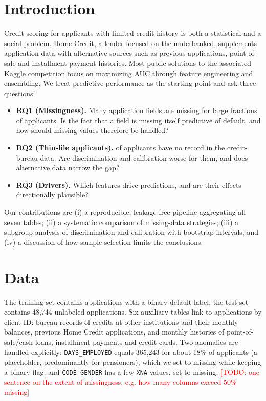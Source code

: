 \documentclass[10pt]{article}
\newcommand{\todo}[1]{\textcolor{red}{[TODO: #1]}}
\begin{document}
\section{Introduction}
Credit scoring for applicants with limited credit history is both a statistical and a social problem. Home Credit, a lender focused on the underbanked, supplements application data with alternative sources such as previous applications, point-of-sale and installment payment histories. Most public solutions to the associated Kaggle competition focus on maximizing AUC through feature engineering and ensembling. We treat predictive performance as the starting point and ask three questions:
\begin{itemize}\itemsep0pt
\item \textbf{RQ1 (Missingness).} Many application fields are missing for large fractions of applicants. Is the fact that a field is missing itself predictive of default, and how should missing values therefore be handled?
\item \textbf{RQ2 (Thin-file applicants).} \ThinShare{} of applicants have no record in the credit-bureau data. Are discrimination and calibration worse for them, and does alternative data narrow the gap?
\item \textbf{RQ3 (Drivers).} Which features drive predictions, and are their effects directionally plausible?
\end{itemize}
Our contributions are (i) a reproducible, leakage-free pipeline aggregating all seven tables; (ii) a systematic comparison of missing-data strategies; (iii) a subgroup analysis of discrimination and calibration with bootstrap intervals; and (iv) a discussion of how sample selection limits the conclusions.

\section{Data}
The training set contains \NTrain{} applications with a binary default label; the test set contains 48,744 unlabeled applications. Six auxiliary tables link to applications by client ID: bureau records of credits at other institutions and their monthly balances, previous Home Credit applications, and monthly histories of point-of-sale/cash loans, installment payments and credit cards. Two anomalies are handled explicitly: \texttt{DAYS\_EMPLOYED} equals 365,243 for about 18\% of applicants (a placeholder, predominantly for pensioners), which we set to missing while keeping a binary flag; and \texttt{CODE\_GENDER} has a few \texttt{XNA} values, set to missing. \todo{one sentence on the extent of missingness, e.g. how many columns exceed 50\% missing}
\end{document}
